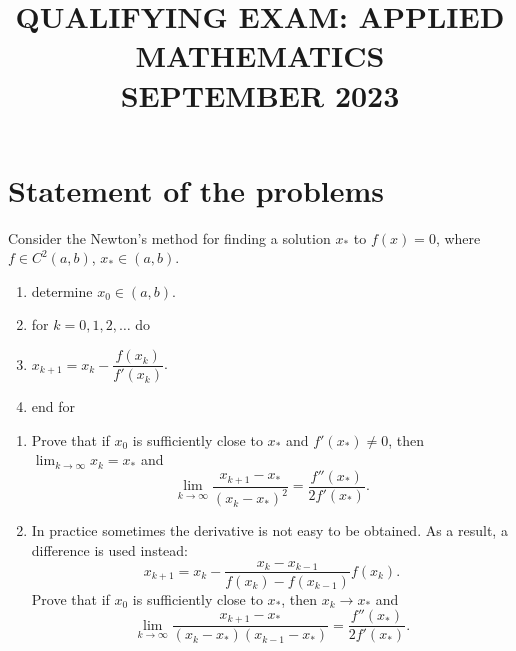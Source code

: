 \documentclass[11pt,a4paper]{article}
\title{\textbf{QUALIFYING EXAM: APPLIED MATHEMATICS}\\[0.5em]\Large SEPTEMBER 2023}
\date{}
\author{}
\newcommand{\examstatement}[1]{%
  \par\addvspace{0.85em}%
  \noindent{\bfseries #1}\par\nobreak\addvspace{0.28em}%
}
\begin{document}
\maketitle
\vspace{-3em}

\tableofcontents

\section{Statement of the problems}

\examstatement{Problem 1.}
Consider the Newton's method for finding a solution \(x_{*}\) to \(f(x) = 0\), where \(f \in C^{2}(a, b)\), \(x_{*} \in (a, b)\).
\begin{enumerate}[label=\arabic*:,leftmargin=2em]
    \item determine \(x_{0} \in (a, b)\).
    \item for \(k = 0, 1, 2, \dots\) do
    \item \(x_{k+1} = x_{k} - \dfrac{f(x_{k})}{f'(x_{k})}\).
    \item end for
\end{enumerate}
\begin{enumerate}[label=(\arabic*)]
    \item Prove that if \(x_{0}\) is sufficiently close to \(x_{*}\) and \(f'(x_{*}) \neq 0\), then \(\lim_{k \to \infty} x_{k} = x_{*}\) and
    \[
    \lim_{k \to \infty} \frac{x_{k+1} - x_{*}}{(x_{k} - x_{*})^{2}} = \frac{f''(x_{*})}{2 f'(x_{*})}.
    \]
    \item In practice sometimes the derivative is not easy to be obtained. As a result, a difference is used instead:
    \[
    x_{k+1} = x_{k} - \frac{x_{k} - x_{k-1}}{f(x_{k}) - f(x_{k-1})} f(x_{k}).
    \]
    Prove that if \(x_{0}\) is sufficiently close to \(x_{*}\), then \(x_{k} \to x_{*}\) and
    \[
    \lim_{k \to \infty} \frac{x_{k+1} - x_{*}}{(x_{k} - x_{*})(x_{k-1} - x_{*})} = \frac{f''(x_{*})}{2 f'(x_{*})}.
    \]
\end{enumerate}
\end{document}
